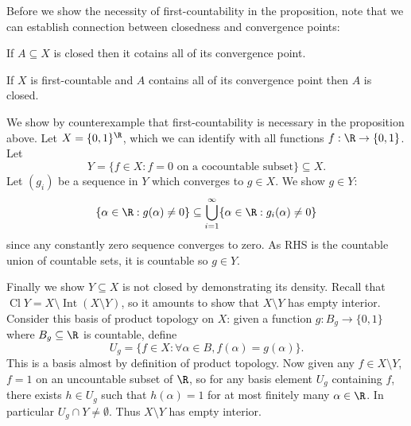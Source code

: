 \documentclass[a4paper]{article}
\DeclareMathOperator{\Cl}{Cl}
\DeclareMathOperator{\Int}{Int}
\begin{document}
Before we show the necessity of first-countability in the proposition, note that we can establish connection between closedness and convergence points:

\begin{corollary}
  If \(A \subseteq X\) is closed then it cotains all of its convergence point.
\end{corollary}

\begin{corollary}
  If \(X\) is first-countable and \(A\) contains all of its convergence point then \(A\) is closed.
\end{corollary}

\begin{eg}
  We show by counterexample that first-countability is necessary in the proposition above. Let \(X = \{0, 1\}^\R\), which we can identify with all functions \(f: \R \to \{0, 1\}\). Let
  \[
    Y = \{f \in X: f = 0 \text{ on a cocountable subset}\} \subseteq X.
  \]
  Let \((g_i)\) be a sequence in \(Y\) which converges to \(g \in X\). We show \(g \in Y\):
  \[
    \{\alpha \in \R: g(\alpha) \neq 0\}
    \subseteq \bigcup_{i = 1}^\infty \{\alpha \in \R: g_i(\alpha) \neq 0\}
  \]
  since any constantly zero sequence converges to zero. As RHS is the countable union of countable sets, it is countable so \(g \in Y\).

  Finally we show \(Y \subseteq X\) is not closed by demonstrating its density. Recall that \(\Cl Y = X \setminus \Int (X \setminus Y)\), so it amounts to show that \(X \setminus Y\) has empty interior. Consider this basis of product topology on \(X\): given a function \(g: B_g \to \{0, 1\}\) where \(B_g \subseteq \R\) is countable, define
  \[
    U_g = \{f \in X: \forall \alpha \in B, f(\alpha) = g(\alpha)\}.
  \]
  This is a basis almost by definition of product topology. Now given any \(f \in X \setminus Y\), \(f = 1\) on an uncountable subset of \(\R\), so for any basis element \(U_g\) containing \(f\), there exists \(h \in U_g\) such that \(h(\alpha) = 1\) for at most finitely many \(\alpha \in \R\). In particular \(U_g \cap Y \neq \emptyset\). Thus \(X \setminus Y\) has empty interior.
\end{eg}
\end{document}
